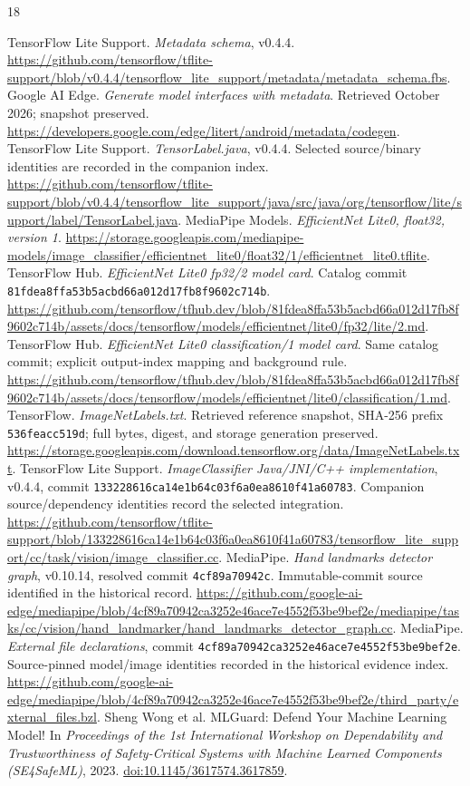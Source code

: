 \documentclass[10pt,conference]{IEEEtran}
\newcommand{\code}[1]{\texttt{#1}}
\begin{document}
\begin{thebibliography}{18}\small\raggedright
{} TensorFlow Lite Support. \emph{Metadata schema}, v0.4.4. \url{https://github.com/tensorflow/tflite-support/blob/v0.4.4/tensorflow_lite_support/metadata/metadata_schema.fbs}.
 Google AI Edge. \emph{Generate model interfaces with metadata}. Retrieved October 2026; snapshot preserved. \url{https://developers.google.com/edge/litert/android/metadata/codegen}.
 TensorFlow Lite Support. \emph{TensorLabel.java}, v0.4.4. Selected source/binary identities are recorded in the companion index. \url{https://github.com/tensorflow/tflite-support/blob/v0.4.4/tensorflow_lite_support/java/src/java/org/tensorflow/lite/support/label/TensorLabel.java}.
 MediaPipe Models. \emph{EfficientNet Lite0, float32, version 1}. \url{https://storage.googleapis.com/mediapipe-models/image_classifier/efficientnet_lite0/float32/1/efficientnet_lite0.tflite}.
 TensorFlow Hub. \emph{EfficientNet Lite0 fp32/2 model card}. Catalog commit \code{81fdea8ffa53b5acbd66a012d17fb8f9602c714b}. \url{https://github.com/tensorflow/tfhub.dev/blob/81fdea8ffa53b5acbd66a012d17fb8f9602c714b/assets/docs/tensorflow/models/efficientnet/lite0/fp32/lite/2.md}.
 TensorFlow Hub. \emph{EfficientNet Lite0 classification/1 model card}. Same catalog commit; explicit output-index mapping and background rule. \url{https://github.com/tensorflow/tfhub.dev/blob/81fdea8ffa53b5acbd66a012d17fb8f9602c714b/assets/docs/tensorflow/models/efficientnet/lite0/classification/1.md}.
 TensorFlow. \emph{ImageNetLabels.txt}. Retrieved reference snapshot, SHA-256 prefix \code{536feacc519d}; full bytes, digest, and storage generation preserved. \url{https://storage.googleapis.com/download.tensorflow.org/data/ImageNetLabels.txt}.
 TensorFlow Lite Support. \emph{ImageClassifier Java/JNI/C++ implementation}, v0.4.4, commit \code{133228616ca14e1b64c03f6a0ea8610f41a60783}. Companion source/dependency identities record the selected integration. \url{https://github.com/tensorflow/tflite-support/blob/133228616ca14e1b64c03f6a0ea8610f41a60783/tensorflow_lite_support/cc/task/vision/image_classifier.cc}.
 MediaPipe. \emph{Hand landmarks detector graph}, v0.10.14, resolved commit \code{4cf89a70942c}. Immutable-commit source identified in the historical record. \url{https://github.com/google-ai-edge/mediapipe/blob/4cf89a70942ca3252e46ace7e4552f53be9bef2e/mediapipe/tasks/cc/vision/hand_landmarker/hand_landmarks_detector_graph.cc}.
 MediaPipe. \emph{External file declarations}, commit \code{4cf89a70942ca3252e46ace7e4552f53be9bef2e}. Source-pinned model/image identities recorded in the historical evidence index. \url{https://github.com/google-ai-edge/mediapipe/blob/4cf89a70942ca3252e46ace7e4552f53be9bef2e/third_party/external_files.bzl}.
 Sheng Wong et al. MLGuard: Defend Your Machine Learning Model! In \emph{Proceedings of the 1st International Workshop on Dependability and Trustworthiness of Safety-Critical Systems with Machine Learned Components (SE4SafeML)}, 2023. \href{https://doi.org/10.1145/3617574.3617859}{doi:10.1145/3617574.3617859}.


\end{thebibliography}
\end{document}
